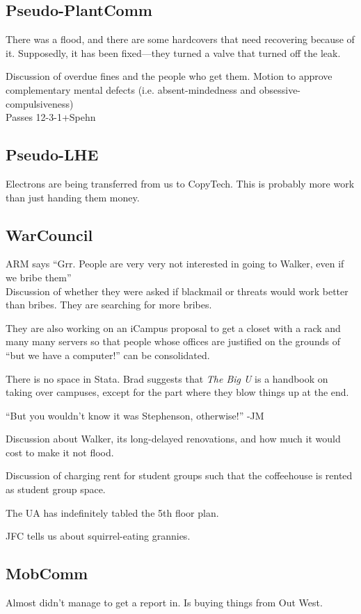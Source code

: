 \documentclass[10pt]{article}
\begin{document}
\subsection*{Pseudo-PlantComm}
There was a flood, and there are some hardcovers that need recovering
because of it. Supposedly, it has been fixed---they turned a valve that turned off
the leak.

Discussion of overdue fines and the people who get them.
Motion to approve complementary mental defects (i.e. absent-mindedness
and obsessive-compulsiveness)\\
Passes 12-3-1+Spehn

\subsection*{Pseudo-LHE}
Electrons are being transferred from us to CopyTech.  This is probably
more work than just handing them money.

\subsection*{WarCouncil}
ARM says ``Grr.  People are very very not interested in going to
Walker, even if we bribe them''\\
Discussion of whether they were asked if blackmail or threats would
work better than bribes.  They are searching for more bribes.

They are also working on an iCampus proposal to get a closet with a
rack and many many servers so that people whose offices are justified
on the grounds of ``but we have a computer!'' can be consolidated.

There is no space in Stata. Brad suggests that \emph{The Big U} is a
handbook on taking over campuses, except for the part where they blow
things up at the end.

``But you wouldn't know it was Stephenson, otherwise!'' -JM

Discussion about Walker, its long-delayed renovations, and how much it
would cost to make it not flood.

Discussion of charging rent for student groups such that the
coffeehouse is rented as student group space.

The UA has indefinitely tabled the 5th floor plan.

JFC tells us about squirrel-eating grannies.

\subsection*{MobComm}
Almost didn't manage to get a report in. Is buying things from Out West.
\end{document}
